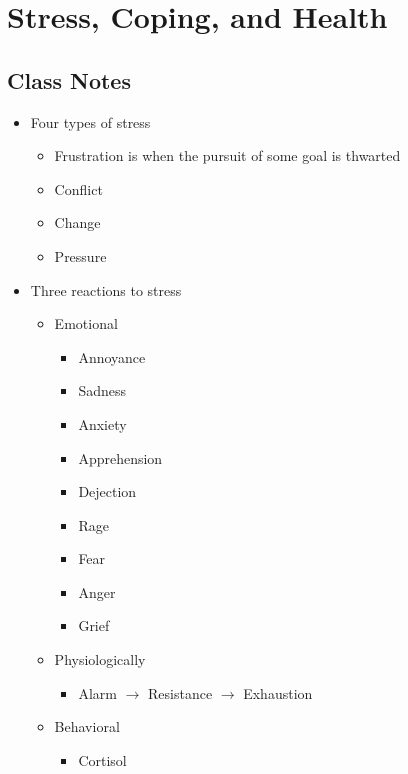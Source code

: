 \documentclass{article}
\begin{document}
\section{Stress, Coping, and Health}

\subsection{Class Notes}
\begin{itemize}
    \item Four types of stress
    \begin{itemize}
        \item Frustration is when the pursuit of some goal is thwarted
        \item Conflict
        \item Change
        \item Pressure
    \end{itemize}

    \item Three reactions to stress
    \begin{itemize}
        \item Emotional
        \begin{itemize}
            \item Annoyance
            \item Sadness
            \item Anxiety
            \item Apprehension
            \item Dejection
            \item Rage
            \item Fear
            \item Anger
            \item Grief
        \end{itemize}
        \item Physiologically
        \begin{itemize}
            \item Alarm $\rightarrow$ Resistance $\rightarrow$ Exhaustion
        \end{itemize}
        \item Behavioral
        \begin{itemize}
            \item Cortisol
        \end{itemize}


\end{itemize}
\end{itemize}
\end{document}
